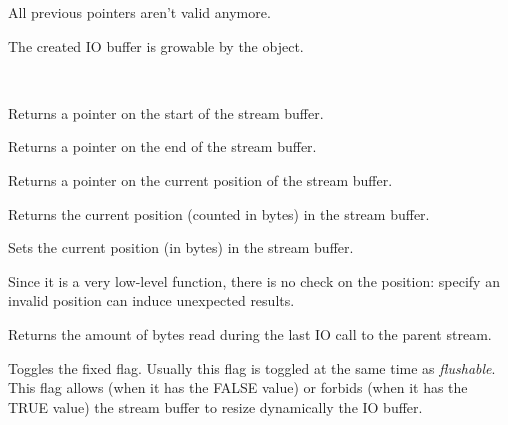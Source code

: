 All previous pointers aren't valid anymore.


The created IO buffer is growable by the object.


\\



Returns a pointer on the start of the stream buffer.



Returns a pointer on the end of the stream buffer.



Returns a pointer on the current position of the stream buffer.



Returns the current position (counted in bytes) in the stream buffer.



Sets the current position (in bytes) in the stream buffer.


Since it is a very low-level function, there is no check on the position:
specify an invalid position can induce unexpected results.



Returns the amount of bytes read during the last IO call to the parent stream.

\label{wxstreambufferfixed}


Toggles the fixed flag. Usually this flag is toggled at the same time as 
{\it flushable}. This flag allows (when it has the FALSE value) or forbids
(when it has the TRUE value) the stream buffer to resize dynamically the IO buffer.


